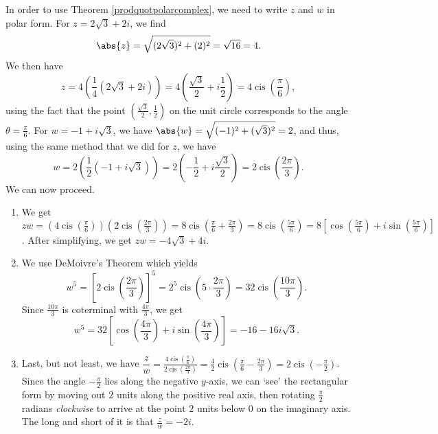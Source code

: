 {In order to use Theorem \ref{prodquotpolarcomplex}, we need to write $z$ and $w$ in polar form.  For $z=2\sqrt{3} + 2i$, we find 
\[
\abs{z} = \sqrt{(2\sqrt{3})^2 + (2)^2} = \sqrt{16} = 4.
\]
We then have
\[
z = 4\left(\frac{1}{4}(2\sqrt{3}+2i)\right) = 4\left(\frac{\sqrt{3}}{2}+i\frac{1}{2}\right) = 4\operatorname{cis}\left(\frac{\pi}{6}\right),
\]
using the fact that the point $\left(\frac{\sqrt{3}}{2},\frac{1}{2}\right)$ on the unit circle corresponds to the angle $\theta = \frac{\pi}{6}$. For $w = -1 + i\sqrt{3}$, we have $\abs{w} = \sqrt{(-1)^2+(\sqrt{3})^2} = 2$, and thus, using the same method that we did for $z$, we have
\[
w = 2\left(\frac{1}{2}(-1+i\sqrt{3})\right) = 2\left(-\frac{1}{2}+i\frac{\sqrt{3}}{2}\right) = 2\operatorname{cis}\left(\frac{2\pi}{3}\right).
\]
  We can now proceed.

\begin{enumerate}

\item  We get $zw = \left(4 \operatorname{cis}\left(\frac{\pi}{6}\right)\right) \left(2\operatorname{cis}\left(\frac{2\pi}{3}\right)\right) = 8\operatorname{cis}\left(\frac{\pi}{6} + \frac{2\pi}{3}\right) = 8\operatorname{cis}\left(\frac{5\pi}{6}\right) = 8\left[ \cos\left(\frac{5\pi}{6}\right) + i\sin\left(\frac{5\pi}{6}\right) \right]$.  After simplifying, we get $zw = -4\sqrt{3} + 4i$.

\item We use DeMoivre's Theorem which yields 
\[
w^{5} = \left[2\operatorname{cis}\left(\frac{2\pi}{3}\right)\right]^{5} = 2^{5} \operatorname{cis} \left(5\cdot \frac{2\pi}{3}\right) = 32 \operatorname{cis}\left(\frac{10\pi}{3}\right).
\]
Since $\frac{10\pi}{3}$ is coterminal with $\frac{4\pi}{3}$, we get
\[
w^{5} = 32\left[ \cos\left(\frac{4\pi}{3}\right) + i\sin\left(\frac{4\pi}{3}\right) \right] = -16-16i\sqrt{3}.
\]

\item  Last, but not least, we have $\dfrac{z}{w} = \frac{4 \operatorname{cis}\left(\frac{\pi}{6}\right)}{2\operatorname{cis}\left(\frac{2\pi}{3}\right)} = \frac{4}{2} \operatorname{cis}\left(\frac{\pi}{6} - \frac{2\pi}{3}\right) = 2\operatorname{cis}\left(-\frac{\pi}{2}\right)$.  Since the angle $-\frac{\pi}{2}$ lies along the negative $y$-axis, we can `see' the rectangular form by moving out $2$ units along the positive real axis, then rotating $\frac{\pi}{2}$ radians \textit{clockwise} to arrive at the point $2$ units below $0$ on the imaginary axis.  The long and short of it is that $\frac{z}{w} = -2i$. 
\end{enumerate}
}

